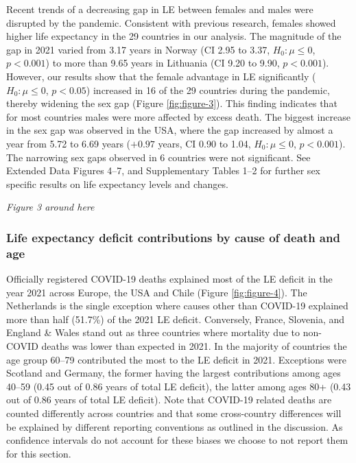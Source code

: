 \documentclass[12pt]{article}
\begin{document}
Recent trends of a decreasing gap in LE between females and males\cite{Zarulli2021} were disrupted by the pandemic. Consistent with previous research, females showed higher life expectancy in the 29 countries in our analysis.
The magnitude of the gap in 2021 varied from 3.17 years in Norway (CI 2.95 to 3.37, $H_0: \mu \leq 0$, $p < 0.001$) to more than 9.65 years in Lithuania (CI 9.20 to 9.90, $p < 0.001$).
However, our results show that the female advantage in LE significantly ($H_0: \mu \leq 0$, $p<0.05$) increased in 16 of the 29 countries during the pandemic, thereby widening the sex gap (Figure \ref{fig:figure-3}).
This finding indicates that for most countries males were more affected by excess death.
The biggest increase in the sex gap was observed in the USA, where the gap increased by almost a year from 5.72 to 6.69 years ($+0.97$ years, CI 0.90 to 1.04, $H_0: \mu \leq 0$, $p < 0.001$).
The narrowing sex gaps observed in 6 countries were not significant. See Extended Data Figures 4--7, and Supplementary Tables 1--2 for further sex specific results on life expectancy levels and changes.

\par\medskip
\emph{Figure 3 around here}
\par\medskip

\subsubsection*{Life expectancy deficit contributions by cause of death and age}

Officially registered COVID-19 deaths explained most of the LE deficit in the year 2021 across Europe, the USA and Chile (Figure \ref{fig:figure-4}). The Netherlands is the single exception where causes other than COVID-19 explained more than half (51.7\%) of the 2021 LE deficit. Conversely, France, Slovenia, and England \& Wales stand out as three countries where mortality due to non-COVID deaths was lower than expected in 2021. In the majority of countries the age group 60--79 contributed the most to the LE deficit in 2021. Exceptions were Scotland and Germany, the former having the largest contributions among ages 40--59 (0.45 out of 0.86 years of total LE deficit), the latter among ages 80+ (0.43 out of 0.86 years of total LE deficit). Note that COVID-19 related deaths are counted differently across countries and that some cross-country differences will be explained by different reporting conventions as outlined in the discussion. As confidence intervals do not account for these biases we choose to not report them for this section.
\end{document}
